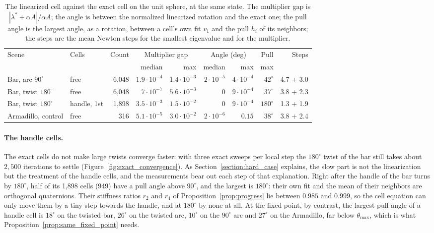 \documentclass{birkjour}
\theoremstyle{remark}
\numberwithin{equation}{section}
\begin{document}
\begin{table}[t]
  \centering
  \caption{The linearized cell against the exact cell on the unit sphere, at the same state. The multiplier gap is $|\lambda^* + \alpha A| / \alpha A$; the angle is between the normalized linearized rotation and the exact one; the pull angle is the largest angle, as a rotation, between a cell's own fit $v_1$ and the pull $h_i$ of its neighbors; the steps are the mean Newton steps for the smallest eigenvalue and for the multiplier.}
  \label{tab:exact_cells}
  {\scriptsize\setlength{\tabcolsep}{2pt}
  \begin{tabular}{llrrrrrrr}
    \toprule
    Scene & Cells & Count & \multicolumn{2}{c}{Multiplier gap} & \multicolumn{2}{c}{Angle (deg)} & Pull & Steps \\
     & & & median & max & median & max & max & \\
    \midrule
    Bar, arc $90^\circ$     & free        & 6{,}048 & $1.9 \cdot 10^{-4}$ & $1.4 \cdot 10^{-3}$ & $2 \cdot 10^{-5}$ & $4 \cdot 10^{-4}$ & $42^\circ$  & 4.7 + 3.0 \\
    Bar, twist $180^\circ$  & free        & 6{,}048 & $7 \cdot 10^{-7}$   & $5.6 \cdot 10^{-3}$ & $0$               & $9 \cdot 10^{-4}$ & $37^\circ$ & 3.8 + 2.3 \\
    Bar, twist $180^\circ$  & handle, 1st & 1{,}898 & $3.5 \cdot 10^{-3}$ & $1.5 \cdot 10^{-2}$ & $0$ & $9 \cdot 10^{-4}$ & $180^\circ$ & 1.3 + 1.9 \\
    Armadillo, control      & free        & 316     & $5.1 \cdot 10^{-5}$ & $3.0 \cdot 10^{-2}$ & $2 \cdot 10^{-6}$ & $0.15$            & $38^\circ$  & 3.8 + 2.4 \\
    \bottomrule
  \end{tabular}}
\end{table}

\paragraph{The handle cells.} The exact cells do not make large twists converge faster: with three exact sweeps per local step the $180^\circ$ twist of the bar still takes about $2{,}500$ iterations to settle (Figure~\ref{fig:exact_convergence}). As Section~\ref{section:hard_case} explains, the slow part is not the linearization but the treatment of the handle cells, and the measurements bear out each step of that explanation. Right after the handle of the bar turns by $180^\circ$, half of its 1{,}898 cells (949) have a pull angle above $90^\circ$, and the largest is $180^\circ$: their own fit and the mean of their neighbors are orthogonal quaternions. Their stiffness ratios $r_2$ and $r_4$ of Proposition~\ref{prop:progress} lie between $0.985$ and $0.999$, so the cell equation can only move them by a tiny step towards the handle, and at $180^\circ$ by none at all. At the fixed point, by contrast, the largest pull angle of a handle cell is $18^\circ$ on the twisted bar, $26^\circ$ on the twisted arc, $10^\circ$ on the $90^\circ$ arc and $27^\circ$ on the Armadillo, far below $\theta_{\max}$, which is what Proposition~\ref{prop:same_fixed_point} needs.
\end{document}
